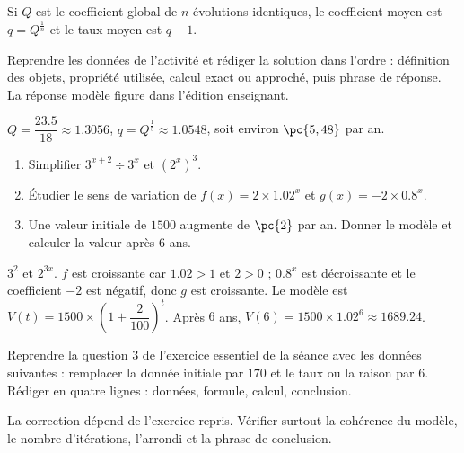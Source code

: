 \begin{summary}Si $Q$ est le coefficient global de $n$ évolutions identiques, le coefficient moyen est $q=Q^{\frac1n}$ et le taux moyen est $q-1$.\end{summary}

\begin{example}
Reprendre les données de l'activité et rédiger la solution dans l'ordre : définition des objets, propriété utilisée, calcul exact ou approché, puis phrase de réponse. La réponse modèle figure dans l'édition enseignant.
\end{example}
\begin{solution}$Q=\dfrac{\num{23,5}}{18}\approx\num{1,3056}$, $q=Q^{\frac15}\approx\num{1,0548}$, soit environ $\pc{5,48}$ par an.\end{solution}

\begin{exercise}[essentiel]
\begin{enumerate}\item Simplifier $3^{x+2}\div3^x$ et $(2^x)^3$.\item Étudier le sens de variation de $f(x)=2\times\num{1,02}^x$ et $g(x)=-2\times\num{0,8}^x$.\item Une valeur initiale de $1500$ augmente de $\pc{2}$ par an. Donner le modèle et calculer la valeur après $6$ ans.\end{enumerate}
\end{exercise}
\begin{solution}$3^2$ et $2^{3x}$. $f$ est croissante car $\num{1,02}>1$ et $2>0$ ; $\num{0,8}^x$ est décroissante et le coefficient $-2$ est négatif, donc $g$ est croissante. Le modèle est $V(t)=1500\times\left(1+\dfrac{2}{100}\right)^t$. Après $6$ ans, $V(6)=1500\times\num{1,02}^6\approx\num{1689,24}$.\end{solution}


\begin{homework}Reprendre la question 3 de l'exercice essentiel de la séance avec les données suivantes : remplacer la donnée initiale par $170$ et le taux ou la raison par $6$. Rédiger en quatre lignes : données, formule, calcul, conclusion.\end{homework}
\begin{solution}La correction dépend de l'exercice repris. Vérifier surtout la cohérence du modèle, le nombre d'itérations, l'arrondi et la phrase de conclusion.\end{solution}

